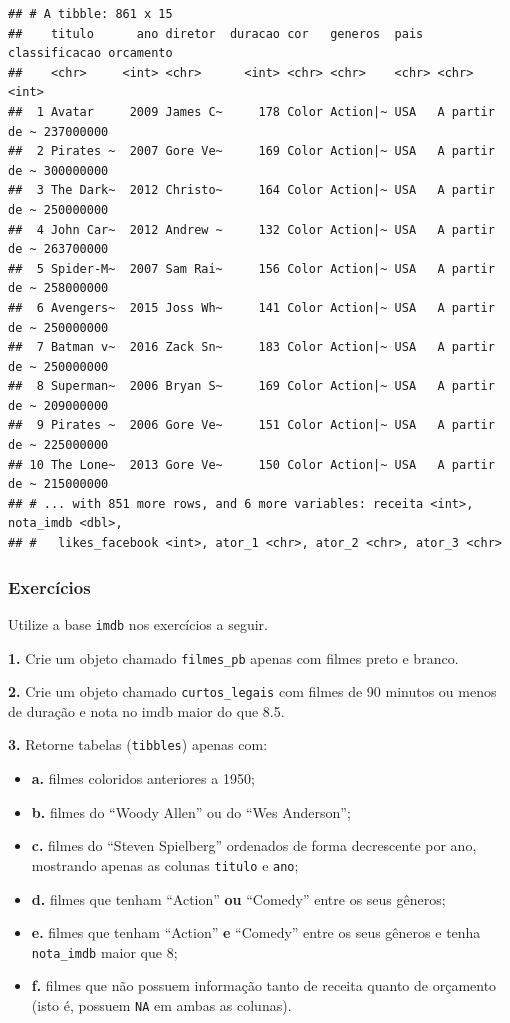 \documentclass[
]{book}
\begin{document}
\begin{verbatim}
## # A tibble: 861 x 15
##    titulo      ano diretor  duracao cor   generos  pais  classificacao orcamento
##    <chr>     <int> <chr>      <int> <chr> <chr>    <chr> <chr>             <int>
##  1 Avatar     2009 James C~     178 Color Action|~ USA   A partir de ~ 237000000
##  2 Pirates ~  2007 Gore Ve~     169 Color Action|~ USA   A partir de ~ 300000000
##  3 The Dark~  2012 Christo~     164 Color Action|~ USA   A partir de ~ 250000000
##  4 John Car~  2012 Andrew ~     132 Color Action|~ USA   A partir de ~ 263700000
##  5 Spider-M~  2007 Sam Rai~     156 Color Action|~ USA   A partir de ~ 258000000
##  6 Avengers~  2015 Joss Wh~     141 Color Action|~ USA   A partir de ~ 250000000
##  7 Batman v~  2016 Zack Sn~     183 Color Action|~ USA   A partir de ~ 250000000
##  8 Superman~  2006 Bryan S~     169 Color Action|~ USA   A partir de ~ 209000000
##  9 Pirates ~  2006 Gore Ve~     151 Color Action|~ USA   A partir de ~ 225000000
## 10 The Lone~  2013 Gore Ve~     150 Color Action|~ USA   A partir de ~ 215000000
## # ... with 851 more rows, and 6 more variables: receita <int>, nota_imdb <dbl>,
## #   likes_facebook <int>, ator_1 <chr>, ator_2 <chr>, ator_3 <chr>
\end{verbatim}

\hypertarget{exercuxedcios-13}{%
\subsubsection*{Exercícios}\label{exercuxedcios-13}}

Utilize a base \texttt{imdb} nos exercícios a seguir.

\textbf{1.} Crie um objeto chamado \texttt{filmes\_pb} apenas com filmes preto e branco.

\textbf{2.} Crie um objeto chamado \texttt{curtos\_legais} com filmes de 90 minutos ou menos de duração e nota no imdb maior do que 8.5.

\textbf{3.} Retorne tabelas (\texttt{tibbles}) apenas com:

\begin{itemize}
\item
  \textbf{a.} filmes coloridos anteriores a 1950;
\item
  \textbf{b.} filmes do ``Woody Allen'' ou do ``Wes Anderson'';
\item
  \textbf{c.} filmes do ``Steven Spielberg'' ordenados de forma decrescente por ano, mostrando apenas as colunas \texttt{titulo} e \texttt{ano};
\item
  \textbf{d.} filmes que tenham ``Action'' \textbf{ou} ``Comedy'' entre os seus gêneros;
\item
  \textbf{e.} filmes que tenham ``Action'' \textbf{e} ``Comedy'' entre os seus gêneros e tenha \texttt{nota\_imdb} maior que 8;
\item
  \textbf{f.} filmes que não possuem informação tanto de receita quanto de orçamento (isto é, possuem \texttt{NA} em ambas as colunas).
\end{itemize}
\end{document}
